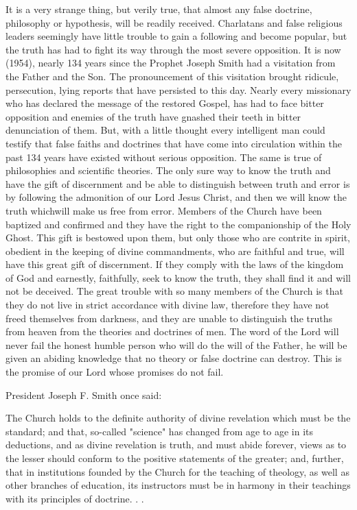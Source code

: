 It is a very strange thing, but verily true, that almost any false doctrine, philosophy or
hypothesis, will be readily received. Charlatans and false religious leaders seemingly have
little trouble to gain a following and become popular, but the truth has had to fight its way
through the most severe opposition. It is now (1954), nearly 134 years since the Prophet
Joseph Smith had a visitation from the Father and the Son. The pronouncement of this
visitation brought ridicule, persecution, lying reports that have persisted to this day. Nearly
every missionary who has declared the message of the restored Gospel, has had to face bitter
opposition and enemies of the truth have gnashed their teeth in bitter denunciation of them.
But, with a little thought every intelligent man could testify that false faiths and doctrines that
have come into circulation within the past 134 years have existed without serious opposition.
The same is true of philosophies and scientific theories. The only sure way to know the truth
and have the gift of discernment and be able to distinguish between truth and error is by
following the admonition of our Lord Jesus Christ, and then we will know the truth whichwill make us free from error. Members of the Church have been baptized and confirmed and
they have the right to the companionship of the Holy Ghost. This gift is bestowed upon them,
but only those who are contrite in spirit, obedient in the keeping of divine commandments,
who are faithful and true, will have this great gift of discernment. If they comply with the
laws of the kingdom of God and earnestly, faithfully, seek to know the truth, they shall find it
and will not be deceived. The great trouble with so many members of the Church is that they
do not live in strict accordance with divine law, therefore they have not freed themselves
from darkness, and they are unable to distinguish the truths from heaven from the theories
and doctrines of men. The word of the Lord will never fail the honest humble person who
will do the will of the Father, he will be given an abiding knowledge that no theory or false
doctrine can destroy. This is the promise of our Lord whose promises do not fail.

President Joseph F. Smith once said:

The Church holds to the definite authority of divine revelation which must be the standard;
and that, so-called "science" has changed from age to age in its deductions, and as divine
revelation is truth, and must abide forever, views as to the lesser should conform to the
positive statements of the greater; and, further, that in institutions founded by the Church for
the teaching of theology, as well as other branches of education, its instructors must be in
harmony in their teachings with its principles of doctrine. . .

